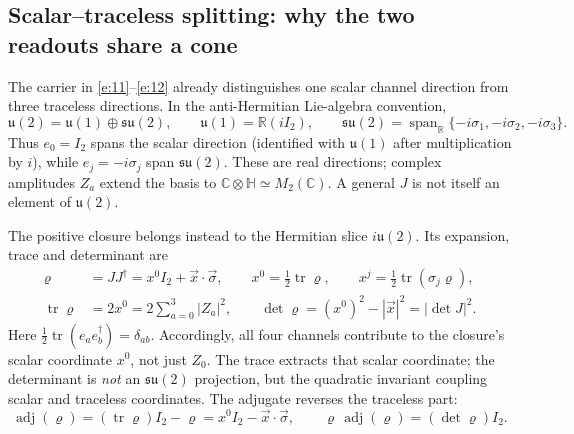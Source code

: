 \documentclass[10pt]{article}
\newcommand{\tr}{\operatorname{tr}}
\newcommand{\adj}{\operatorname{adj}}
\DeclareMathOperator{\spanop}{span}
\begin{document}
\subsection{Scalar--traceless splitting: why the two readouts share a cone}

The carrier in \eqref{e:11}--\eqref{e:12} already distinguishes one scalar channel direction from three traceless directions. In the anti-Hermitian Lie-algebra convention,
\begin{equation}
\mathfrak u(2)=\mathfrak u(1)\oplus\mathfrak{su}(2),\qquad \mathfrak u(1)=\mathbb R(iI_2),\qquad \mathfrak{su}(2)=\spanop_{\mathbb R}\{-i\sigma_1,-i\sigma_2,-i\sigma_3\}.\label{e:26}
\end{equation}
Thus $e_0=I_2$ spans the scalar direction (identified with $\mathfrak u(1)$ after multiplication by $i$), while $e_j=-i\sigma_j$ span $\mathfrak{su}(2)$. These are real directions; complex amplitudes $Z_a$ extend the basis to $\mathbb C\otimes\mathbb H\simeq M_2(\mathbb C)$. A general $J$ is not itself an element of $\mathfrak u(2)$.

The positive closure belongs instead to the Hermitian slice $i\mathfrak u(2)$. Its expansion, trace and determinant are
\begin{align}
\varrho&=JJ^\dagger=x^0I_2+\vec x\cdot\vec\sigma,\qquad x^0=\tfrac12\tr\varrho,\qquad x^j=\tfrac12\tr(\sigma_j\varrho),\label{e:27}\\
\tr\varrho&=2x^0=2\sum_{a=0}^{3}|Z_a|^2,\qquad \det\varrho=(x^0)^2-|\vec x|^2=|\det J|^2.\label{e:28}\end{align}
Here $\frac12\tr(e_ae_b^\dagger)=\delta_{ab}$. Accordingly, all four channels contribute to the closure's scalar coordinate $x^0$, not just $Z_0$. The trace extracts that scalar coordinate; the determinant is \emph{not} an $\mathfrak{su}(2)$ projection, but the quadratic invariant coupling scalar and traceless coordinates. The adjugate reverses the traceless part:
\begin{equation}
\adj(\varrho)=(\tr\varrho)I_2-\varrho=x^0I_2-\vec x\cdot\vec\sigma,\qquad \varrho\,\adj(\varrho)=(\det\varrho)I_2.\label{e:29}
\end{equation}
\end{document}
